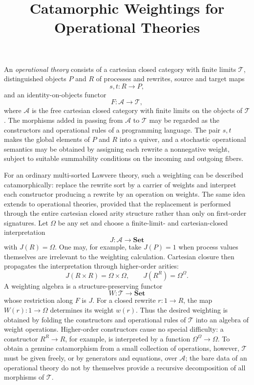 \documentclass[10pt]{article}
\title{\vspace{-1.5em}Catamorphic Weightings for Operational Theories}
\author{}
\date{\vspace{-2em}}
\newcommand{\T}{\mathcal{T}}
\newcommand{\A}{\mathcal{A}}
\begin{document}
\maketitle
\vspace{-1.2em}

An \emph{operational theory} consists of a cartesian closed category with finite
limits $\T$, distinguished objects $P$ and $R$ of processes and rewrites,
source and target maps
\[
s,t:R\to P,
\]
and an identity-on-objects functor
\[
F:\A\to\T,
\]
where $\A$ is the free cartesian closed category with finite limits on the
objects of $\T$.  The morphisms added in passing from $\A$ to $\T$ may be
regarded as the constructors and operational rules of a programming language.
The pair $s,t$ makes the global elements of $P$ and $R$ into a quiver, and a
stochastic operational semantics may be obtained by assigning each rewrite a
nonnegative weight, subject to suitable summability conditions on the incoming
and outgoing fibers.

For an ordinary multi-sorted Lawvere theory, such a weighting can be described
catamorphically: replace the rewrite sort by a carrier of weights and interpret
each constructor producing a rewrite by an operation on weights.  The same
idea extends to operational theories, provided that the replacement is
performed through the entire cartesian closed arity structure rather than only
on first-order signatures.  Let $\Omega$ be any set
and choose a finite-limit- and cartesian-closed interpretation
\[
J:\A\to\mathbf{Set}
\]
with $J(R)=\Omega$.  One may, for example, take $J(P)=1$ when process values
themselves are irrelevant to the weighting calculation.  Cartesian closure
then propagates the interpretation through higher-order arities:
\[
J(R\times R)=\Omega\times\Omega,
\qquad
J(R^R)=\Omega^\Omega.
\]
A weighting algebra is a structure-preserving functor
\[
W:\T\to\mathbf{Set}
\]
whose restriction along $F$ is $J$.  For a closed rewrite $r:1\to R$, the map
$W(r):1\to\Omega$ determines its weight $w(r)$.  Thus the desired weighting is
obtained by folding the constructors and operational rules of $\T$ into an
algebra of weight operations.  Higher-order constructors cause no special
difficulty: a constructor $R^R\to R$, for example, is interpreted by a
function $\Omega^\Omega\to\Omega$.  To obtain a genuine catamorphism from a
small collection of operations, however, $\T$ must be given freely, or by
generators and equations, over $\A$; the bare data of an operational theory do
not by themselves provide a recursive decomposition of all morphisms of
$\T$.
\end{document}
